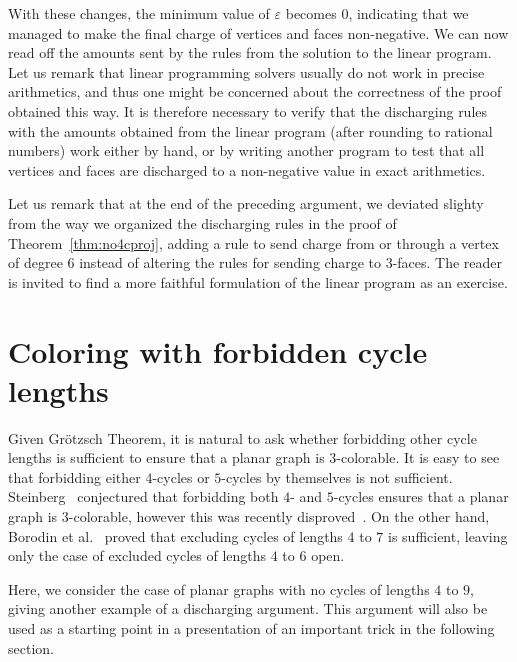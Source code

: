 \documentclass[12pt,twoside,openright,a4paper]{book}
\begin{document}
With these changes, the minimum value of $\varepsilon$ becomes $0$, indicating that we managed to make the final charge
of vertices and faces non-negative.  We can now read off the amounts sent by the rules from the solution to the linear program.
Let us remark that linear programming solvers usually do not work in precise arithmetics, and thus one might be concerned
about the correctness of the proof obtained this way.  It is therefore necessary to verify that the discharging rules with
the amounts obtained from the linear program (after rounding to rational numbers) work either by hand, or by writing another program
to test that all vertices and faces are discharged to a non-negative value in exact arithmetics.

Let us remark that at the end of the preceding argument, we deviated slighty from the way we organized the discharging rules
in the proof of Theorem~\ref{thm:no4cproj}, adding a rule to send charge from or through a vertex of degree 6 instead of altering
the rules for sending charge to $3$-faces.  The reader is invited to find a more faithful formulation of the linear program
as an exercise.

\section{Coloring with forbidden cycle lengths}

Given Gr\"otzsch Theorem, it is natural to ask whether forbidding other cycle lengths is sufficient to
ensure that a planar graph is $3$-colorable.  It is easy to see that forbidding either $4$-cycles or $5$-cycles
by themselves is not sufficient.  Steinberg~\cite{conj-stein} conjectured that forbidding both $4$- and $5$-cycles
ensures that a planar graph is $3$-colorable, however this was recently disproved~\cite{steinfalse}.
On the other hand, Borodin et al.~\cite{bor47} proved that excluding cycles of lengths $4$ to $7$ is sufficient,
leaving only the case of excluded cycles of lengths $4$ to $6$ open.

Here, we consider the case of planar graphs with no cycles of lengths $4$ to $9$,
giving another example of a discharging argument.
This argument will also be used as a starting point in a presentation of an important trick in the following section.
\end{document}

